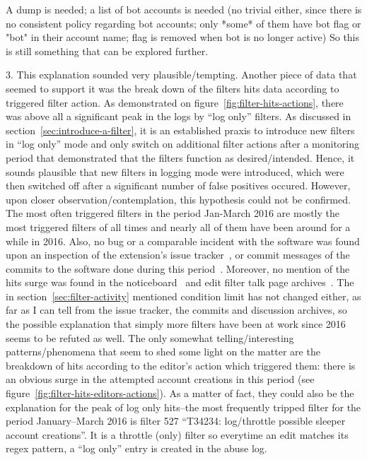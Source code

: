 A dump is needed; a list of bot accounts is needed (no trivial either, since there is no consistent policy regarding bot accounts; only *some* of them have bot flag or "bot" in their account name; flag is removed when bot is no longer active) %
So this is still something that can be explored further.

3. This explanation sounded very plausible/tempting.
Another piece of data that seemed to support it was the break down of the filters hits data according to triggered filter action.
As demonstrated on figure~\ref{fig:filter-hits-actions}, there was above all a significant peak in the logs by ``log only'' filters.
As discussed in section~\ref{sec:introduce-a-filter}, it is an established praxis to introduce new filters in ``log only'' mode and only switch on additional filter actions after a monitoring period that demonstrated that the filters function as desired/intended.
Hence, it sounds plausible that new filters in logging mode were introduced, which were then switched off after a significant number of false positives occured.
However, upon closer observation/contemplation, this hypothesis could not be confirmed.
The most often triggered filters in the period Jan-March 2016 are mostly the most triggered filters of all times and nearly all of them have been around for a while in 2016.
Also, no bug or a comparable incident with the software was found upon an inspection of the extension's issue tracker~\cite{phab-abusefilter-2015}, or commit messages of the commits to the software done during this period~\cite{gerrit-abusefilter-source}.
Moreover, no mention of the hits surge was found in the noticeboard~\cite{Wikipedia:EditFilterNoticeboard} and edit filter talk page archives~\cite{Wikipedia:EditFilterTalkArchive2016}.
The in section~\ref{sec:filter-activity} mentioned condition limit has not changed either, as far as I can tell from the issue tracker, the commits and discussion archives, so the possible explanation that simply more filters have been at work since 2016 seems to be refuted as well.
The only somewhat telling/interesting patterns/phenomena that seem to shed some light on the matter are the breakdown of hits according to the editor's action which triggered them: there is an obvious surge in the attempted account creations in this period (see figure~\ref{fig:filter-hits-editors-actions}).
As a matter of fact, they could also be the explanation for the peak of log only hits–the most frequently tripped filter for the period January–March 2016 is filter 527 ``T34234: log/throttle possible sleeper account creations''.
It is a throttle (only) filter so everytime an edit matches its regex pattern, a ``log only'' entry is created in the abuse log.


